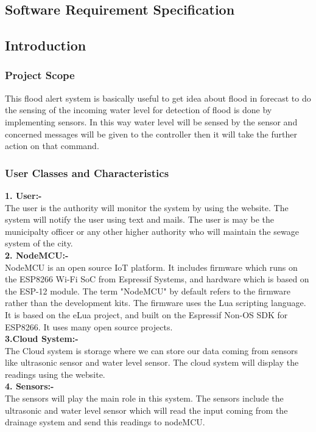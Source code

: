 \documentclass[a4paper,12pt]{report}
\begin{document}
\begin{itemize}
\chapter {Software Requirement Specification}
\section{Introduction}
\subsection{Project Scope}
This flood alert system is basically useful to get idea about flood in forecast to do the sensing of the incoming water level for detection of flood is done by implementing sensors. In this way water level will be sensed by the sensor and concerned messages will be given to the controller then it will take the further action on that command.





\subsection{User Classes and Characteristics}
\textbf{1. User:- }\\The user is the authority will monitor the system by using the website. The system will notify the user using text and mails. The user is may be the municipalty officer or any other higher authority who will maintain the sewage system of the city. \\ 
\textbf{2. NodeMCU:-}\\ NodeMCU is an open source IoT platform. It includes firmware which runs on the ESP8266 Wi-Fi SoC from Espressif Systems, and hardware which is based on the ESP-12 module. The term "NodeMCU" by default refers to the firmware rather than the development kits. The firmware uses the Lua scripting language. It is based on the eLua project, and built on the Espressif Non-OS SDK for ESP8266. It uses many open source projects. \\\newline
\textbf{3.Cloud System:-}\\ The Cloud system is storage where we can store our data coming from sensors like ultrasonic sensor and water level sensor. The cloud system will display the readings using the website. \\\newline
\textbf{4. Sensors:-}\\ The sensors will play the main role in this system. The sensors include the ultrasonic and water level sensor which will read the input coming from the drainage system and send this readings to nodeMCU.  


\end{itemize}
\end{document}
